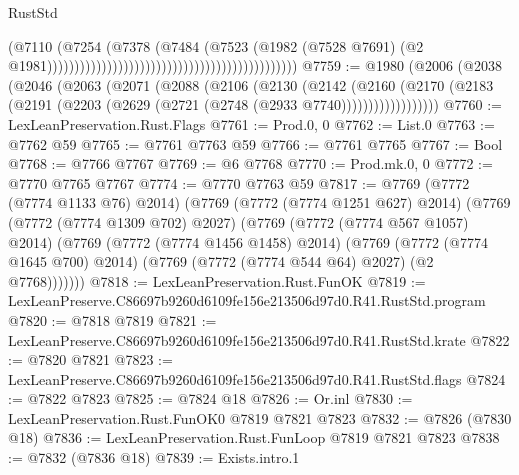 \begin{lexlean}{RustStd}
\begin{coremodule}
                                                                                  (@7110
                                                                                    (@7254
                                                                                      (@7378
                                                                                        (@7484
                                                                                          (@7523
                                                                                            (@1982
                                                                                              (@7528
                                                                                                @7691)
                                                                                              (@2
                                                                                                @1981))))))))))))))))))))))))))))))))))))))))))))))
@7759 := @1980
    (@2006
      (@2038
        (@2046
          (@2063
            (@2071
              (@2088
                (@2106
                  (@2130
                    (@2142
                      (@2160
                        (@2170
                          (@2183 (@2191 (@2203 (@2629 (@2721 (@2748 (@2933 @7740))))))))))))))))))
@7760 := LexLeanPreservation.Rust.Flags
@7761 := Prod.{0, 0}
@7762 := List.{0}
@7763 := @7762 @59
@7765 := @7761 @7763 @59
@7766 := @7761 @7765
@7767 := Bool
@7768 := @7766 @7767
@7769 := @6 @7768
@7770 := Prod.mk.{0, 0}
@7772 := @7770 @7765 @7767
@7774 := @7770 @7763 @59
@7817 := @7769
    (@7772 (@7774 @1133 @76) @2014)
    (@7769
      (@7772 (@7774 @1251 @627) @2014)
      (@7769
        (@7772 (@7774 @1309 @702) @2027)
        (@7769
          (@7772 (@7774 @567 @1057) @2014)
          (@7769
            (@7772 (@7774 @1456 @1458) @2014)
            (@7769
              (@7772 (@7774 @1645 @700) @2014)
              (@7769 (@7772 (@7774 @544 @64) @2027) (@2 @7768)))))))
@7818 := LexLeanPreservation.Rust.FunOK
@7819 := LexLeanPreserve.C86697b9260d6109fe156e213506d97d0.R41.RustStd.program
@7820 := @7818 @7819
@7821 := LexLeanPreserve.C86697b9260d6109fe156e213506d97d0.R41.RustStd.krate
@7822 := @7820 @7821
@7823 := LexLeanPreserve.C86697b9260d6109fe156e213506d97d0.R41.RustStd.flags
@7824 := @7822 @7823
@7825 := @7824 @18
@7826 := Or.inl
@7830 := LexLeanPreservation.Rust.FunOK0 @7819 @7821 @7823
@7832 := @7826 (@7830 @18)
@7836 := LexLeanPreservation.Rust.FunLoop @7819 @7821 @7823
@7838 := @7832 (@7836 @18)
@7839 := Exists.intro.{1}

\end{coremodule}
\end{lexlean}

